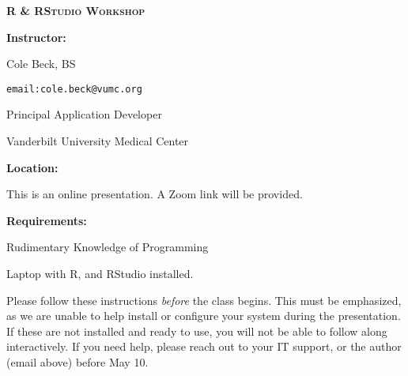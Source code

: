 \documentclass[twocolumn]{article}
\begin{document}
\textbf{\LARGE{\textsc{R \& RStudio Workshop}}}


\vspace*{\fill}

\begin{flushleft}

\textbf{Instructor:}

Cole Beck, BS

\texttt{email:cole.beck@vumc.org}

Principal Application Developer

Vanderbilt University Medical Center
\end{flushleft}

\vspace*{\fill}

\begin{flushleft}
\textbf{Location:}

This is an online presentation. A Zoom link will be provided.
\end{flushleft}

\vspace*{\fill}

\begin{flushleft}

\textbf{Requirements:}

Rudimentary Knowledge of Programming

Laptop with R, and RStudio installed.

Please follow these instructions \textit{before} the class begins. This must be emphasized, as we are unable to help install or configure your system during the presentation. If these are not installed and ready to use, you will not be able to follow along interactively. If you need help, please reach out to your IT support, or the author (email above) before May 10.

\end{flushleft}

\vspace*{\fill}
\end{document}
